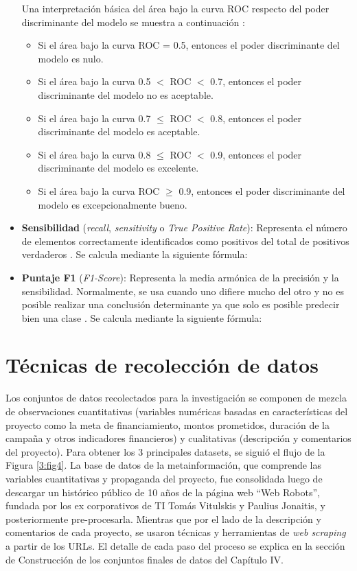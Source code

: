 \begin{itemize}
	Una interpretación básica del área bajo la curva ROC respecto del poder discriminante del modelo se muestra a continuación \parencite{bk_britos2006datamining}:
	\begin{itemize}
		\item Si el área bajo la curva ROC = 0.5, entonces el poder discriminante del modelo es nulo.
		\item Si el área bajo la curva 0.5 $<$ ROC $<$ 0.7, entonces el poder discriminante del modelo no es aceptable.
		\item Si el área bajo la curva 0.7 $\leq$ ROC $<$ 0.8, entonces el poder discriminante del modelo es aceptable.
		\item Si el área bajo la curva 0.8 $\leq$ ROC $<$ 0.9, entonces el poder discriminante del modelo es excelente.
		\item Si el área bajo la curva ROC $\geq$ 0.9, entonces el poder discriminante del modelo es excepcionalmente bueno.
	\end{itemize}
	\item \textbf{Sensibilidad} (\textit{recall}, \textit{sensitivity} o \textit{True Positive Rate}): Representa el número de elementos correctamente identificados como positivos del total de positivos verdaderos \parencite{gl_bigdata2019metricas}. Se calcula mediante la siguiente fórmula:
	\item \textbf{Puntaje F1} (\textit{F1-Score}): Representa la media armónica de la precisión y la sensibilidad. Normalmente, se usa cuando uno difiere mucho del otro y no es posible realizar una conclusión determinante ya que solo es posible predecir bien una clase \parencite{gl_bigdata2019metricas}. Se calcula mediante la siguiente fórmula:
\end{itemize}

\section{Técnicas de recolección de datos}
Los conjuntos de datos recolectados para la investigación se componen de mezcla de observaciones cuantitativas (variables numéricas basadas en características del proyecto como la meta de financiamiento, montos prometidos, duración de la campaña y otros indicadores financieros) y cualitativas (descripción y comentarios del proyecto). Para obtener los 3 principales datasets, se siguió el flujo de la Figura \ref{3:fig4}. La base de datos de la metainformación, que comprende las variables cuantitativas y propaganda del proyecto, fue consolidada luego de descargar un histórico público de 10 años de la página web “Web Robots”, fundada por los ex corporativos de TI Tomás Vitulskis y Paulius Jonaitis, y posteriormente pre-procesarla. Mientras que por el lado de la descripción y comentarios de cada proyecto, se usaron técnicas y herramientas de \textit{web scraping} a partir de los URLs. El detalle de cada paso del proceso se explica en la sección de Construcción de los conjuntos finales de datos del Capítulo IV.

